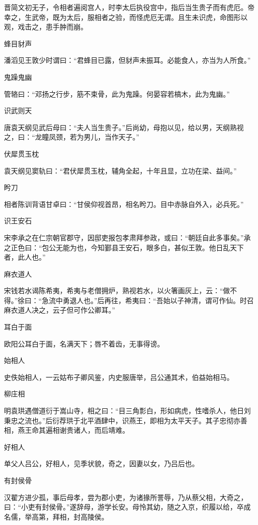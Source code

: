 \documentclass[a4paper,12pt,UTF8,twoside]{ctexbook}
\begin{document}
    晋简文初无子，令相者遍阅宫人，时李太后执役宫中，指后当生贵子而有虎厄。帝幸之，生武帝，既为太后，服相者之验，而怪虎厄无谓。且生未识虎，命图形以观，戏击之，患手肿而崩。
    
    蜂目豺声
    
    潘滔见王敦少时谓曰：“君蜂目已露，但豺声未振耳。必能食人，亦当为人所食。”
    
    鬼躁鬼幽
    
    管辂曰：“邓扬之行步，筋不束骨，此为鬼躁。何晏容若槁木，此为鬼幽。”
    
    识武则天
    
    唐袁天纲见武后母曰：“夫人当生贵子。”后尚幼，母抱以见，给以男，天纲熟视之，曰：“龙瞳凤颈，若为男儿，当作天子。”
    
    伏犀贯玉枕
    
    袁天纲见窦轨曰：“君伏犀贯玉枕，辅角全起，十年且显，立功在梁、益间。”
    
    盻刀
    
    相者陈训背语甘卓曰：“甘侯仰视首昂，相名盻刀。目中赤脉自外入，必兵死。”
    
    识王安石
    
    宋李承之在仁宗朝官郡守，因邸吏报包孝肃拜参政，或曰：“朝廷自此多事矣。”承之正色曰：“包公无能为也，今知鄞县王安石，眼多白，甚似王敦。他日乱天下者，此人也。”
    
    麻衣道人
    
    宋钱若水谒陈希夷，希夷与老僧拥炉，熟视若水，以火箸画灰上，云：“做不得。”徐曰：“急流中勇退人也。”后再往，希夷曰：“吾始以子神清，谓可作仙。时召麻衣道人决之，云子但可作公卿耳。”
    
    耳白于面
    
    欧阳公耳白于面，名满天下；唇不着齿，无事得谤。
    
    始相人
    
    史佚始相人，一云姑布子卿风鉴，内史服唐举，吕公通其术，伯益始相马。
    
    柳庄相
    
    明袁珙遇僧道衍于嵩山寺，相之曰：“目三角彯白，形如病虎，性嗜杀人，他日刘秉忠之流也。”后衍荐珙于北平酒肆中，识燕王，即相为太平天子。其子忠彻亦善相，燕王命其遍相谢贵诸人，而后靖难。
    
    好相人
    
    单父人吕公，好相人，见季状貌，奇之，因妻以女，乃吕后也。
    
    有封侯骨
    
    汉翟方进少孤，事后母孝，尝为郡小吏，为诸掾所詈辱，乃从蔡父相，大奇之，曰：“小吏有封侯骨。”遂辞母，游学长安。母怜其幼，随之入京，织履以给，卒成名儒，举高第，拜相，封高陵侯。
    
\end{document}

